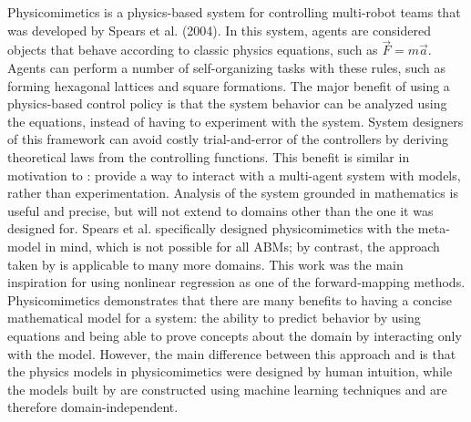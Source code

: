 Physicomimetics is a physics-based system for controlling multi-robot teams that was developed by Spears et al. (2004)\nocite{spears2004dpb}.
In this system, agents are considered objects that behave according to classic physics equations, such as $\vec{F} = m \vec{a}$.
Agents can perform a number of self-organizing tasks with these rules, such as forming hexagonal lattices and square formations.
The major benefit of using a physics-based control policy is that the system behavior can be analyzed using the equations, instead of having to experiment with the system.
System designers of this framework can avoid costly trial-and-error of the controllers by deriving theoretical laws from the controlling functions.
This benefit is similar in motivation to \fw: provide a way to interact with a multi-agent system with models, rather than experimentation.
Analysis of the system grounded in mathematics is useful and precise, but will not extend to domains other than the one it was designed for. 
Spears et al. specifically designed physicomimetics with the meta-model in mind, which is not possible for all ABMs; by contrast, the approach taken by \fw is applicable to many more domains.
This work was the main inspiration for using nonlinear regression as one of the forward-mapping methods.
Physicomimetics demonstrates that there are many benefits to having a concise mathematical model for a system: the ability to predict behavior by using equations and being able to prove concepts about the domain by interacting only with the model.
However, the main difference between this approach and \fw is that the physics models in physicomimetics were designed by human intuition,  while the models built by \fw are constructed using machine learning techniques and are therefore domain-independent.

